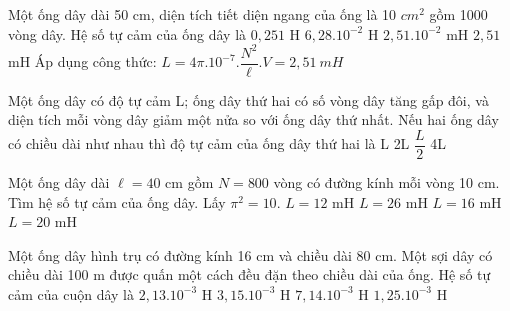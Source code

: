 
\begin{vidu}%
Một ống dây dài 50 cm, diện tích tiết diện ngang của ống là 10 $cm^2$ gồm 1000 vòng dây. Hệ số tự cảm của ống dây là
\choice
{$0,251$ H}
{$6,{28.10^{- 2}}$ H}
{$2,{51.10^{- 2}}$ mH}
{\True $2,51$ mH}
\loigiai
{Áp dụng công thức: $L = 4\pi .{10^{- 7}}.\dfrac{N^2}{\ell}.V=2,51\ mH$}
\end{vidu}
\begin{vidu}%
Một ống dây có độ tự cảm L; ống dây thứ hai có số vòng dây tăng gấp đôi, và diện tích mỗi vòng dây giảm một nửa so với ống dây thứ nhất. Nếu hai ống dây có chiều dài như nhau thì độ tự cảm của ống dây thứ hai là
\choice
{L}
{\True 2L}
{$\dfrac{L}{2}$}
{4L}
\end{vidu}
\begin{vidu}%
Một ống dây dài $\ell = 40$ cm gồm $N = 800$ vòng có đường kính mỗi vòng 10 cm. Tìm hệ số tự cảm của ống dây. Lấy $\pi^2 = 10$.
\choice
{$L = 12$ mH}
{$L = 26$ mH}
{\True $L = 16$ mH}
{$L = 20$ mH}
\end{vidu}
\begin{vidu}%
Một ống dây hình trụ có đường kính 16 cm và chiều dài 80 cm. Một sợi dây có chiều dài 100 m được quấn một cách đều đặn theo chiều dài của ống. Hệ số tự cảm của cuộn dây là
\choice
{$2,13. 10^{-3}$ H}
{$3,15. 10^{-3}$ H}
{$7,14. 10^{-3}$ H}
{\True $1,25. 10^{-3}$ H}
\end{vidu}
